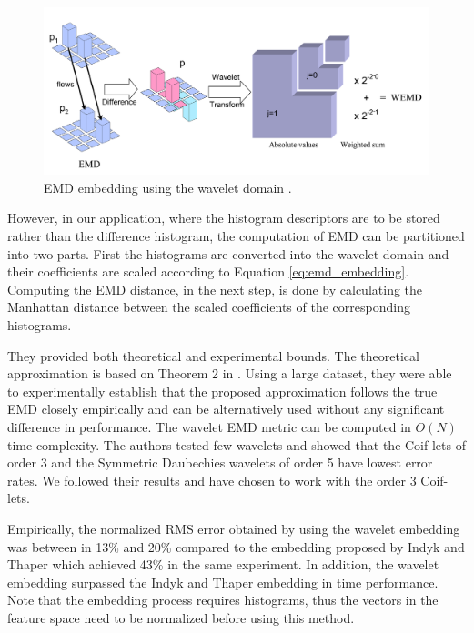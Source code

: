 \begin{figure}
\centering
\includegraphics[width=1\textwidth]{./figures/emd_wavelet}       
\caption{EMD embedding using the wavelet domain \cite{shirdhonkar2008approximate}.}
\label{fig:emd_wavelet} 
\end{figure}

\iftoggle{edit-mode}{\hspace{0pt}\marginpar{Embedding the histograms rather than the difference histogram}}{}
However, in our application, where the histogram descriptors are to be stored rather than the difference histogram, the computation of EMD can be partitioned into two parts. First the histograms are converted into the wavelet domain and their coefficients are scaled according to Equation \ref{eq:emd_embedding}. 
Computing the EMD distance, in the next step, is done by calculating the Manhattan distance between the scaled coefficients of the corresponding histograms.

\iftoggle{edit-mode}{\hspace{0pt}\marginpar{shirdhonkar - theoretical and empirical bounds}}{}
They provided both theoretical and experimental bounds. The theoretical approximation is based on Theorem 2 in \cite{shirdhonkar2008approximate}. Using a large dataset, they were able to experimentally establish that the proposed approximation follows the true EMD closely empirically and can be alternatively used without any significant difference in performance. The wavelet EMD metric can be computed in $O\left( N \right)$ time complexity. The authors tested few wavelets and showed that the Coif-lets of order 3 and the Symmetric Daubechies wavelets of order 5 have lowest error rates. We followed their results and have chosen to work with the order 3 Coif-lets.

\iftoggle{edit-mode}{\hspace{0pt}\marginpar{Performance - Indyk vs. shirdhonkar}}{}
Empirically, the normalized RMS error obtained by using the wavelet embedding was between in 13\% and 20\% compared to the embedding proposed by Indyk and Thaper which achieved 43\% in the same experiment. In addition, the wavelet embedding surpassed the Indyk and Thaper embedding in time performance. Note that the embedding process requires histograms, thus the vectors in the feature space need to be normalized before using this method.

